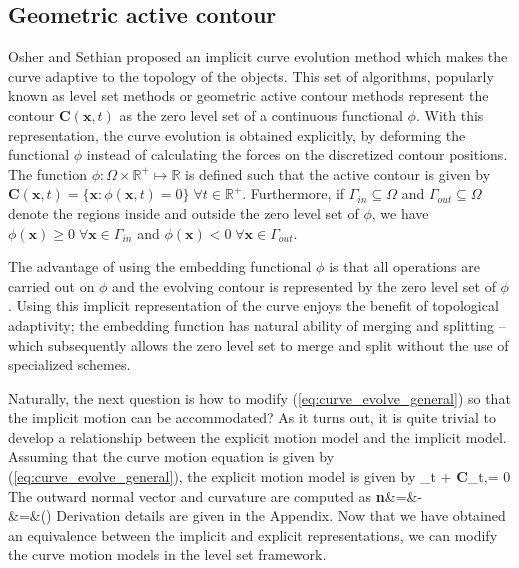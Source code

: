 \subsection{Geometric active contour}
Osher and Sethian\cite{osher_sethian} proposed an implicit curve evolution method which makes the curve adaptive to the topology of the objects. This set of algorithms, popularly known as level set methods or geometric active contour methods represent the contour $\textbf{C}(\textbf{x},t)$  as the zero level set of a continuous functional $\phi$. With this representation, the curve evolution is obtained explicitly, by  deforming the functional $\phi$ instead of calculating the forces on the discretized contour positions. The function $\phi:\Omega\times\mathbb{R}^+\mapsto\mathbb{R}$ is defined such that the active contour is given by $\textbf{C}(\textbf{x},t)=\lbrace\textbf{x}:\phi(\textbf{x},t)=0\rbrace\;\forall t\in\mathbb{R}^+$. Furthermore, if $\Gamma_{in}\subseteq\Omega$ and $\Gamma_{out}\subseteq\Omega$ denote the regions inside and outside the zero level set of $\phi$, we have $\phi(\textbf{x}) \geq 0\; \forall \textbf{x}\in\Gamma_{in}$ and  $\phi(\textbf{x}) < 0\; \forall \textbf{x}\in\Gamma_{out}$.

The advantage of using the embedding functional $\phi$ is that all operations are carried out on $\phi$ and the evolving contour is represented by the zero level set of $\phi$. Using this implicit representation of the curve enjoys the benefit of topological adaptivity; the embedding function has natural ability of merging and splitting -- which subsequently allows the zero level set to merge and split without the use of specialized schemes. 

Naturally, the next question is how to modify (\ref{eq:curve_evolve_general}) so that the implicit motion can be accommodated? As it turns out, it is quite trivial to develop a relationship between the explicit motion model and the implicit model. Assuming that the curve motion equation is given by (\ref{eq:curve_evolve_general}), the explicit motion model is given by
\bea
\phi_t + \langle\textbf{C}_t,\nabla\phi \rangle = 0
\label{eq:explicit_motion_ls}
\eea
The outward normal vector and curvature are computed as
\bea
\textbf{n}&=&-\dfrac{\nabla\phi}{|\nabla\phi|}\\
\kappa&=&\left(\dfrac{\nabla\phi}{|\nabla\phi|}\right)
\label{eq:normal_curvature_ls}
\eea
Derivation details are given in the Appendix. Now that we have obtained an equivalence between the implicit and explicit representations, we can modify the curve motion models in the level set framework. 

